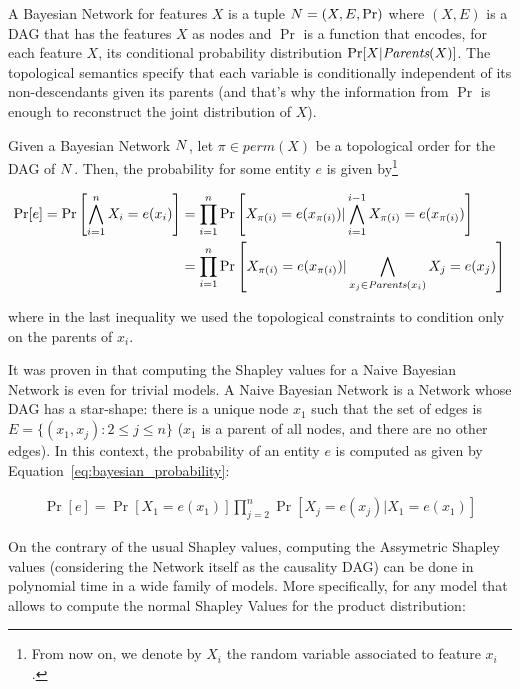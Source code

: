 A Bayesian Network for features $X$ is a tuple $N = (X, E, \Pr)$ where $(X, E)$ is a DAG that has the features $X$ as nodes and $\Pr$ is a function that encodes, for each feature $X$, its conditional probability distribution $\Pr[X | \textit{Parents}(X)]$. The topological semantics specify that each variable is conditionally independent of its non-descendants given its parents (and that's why the information from $\Pr$ is enough to reconstruct the joint distribution of $X$).

Given a Bayesian Network $N$, let $\pi \in perm(X)$ be a topological order for the DAG of $N$. Then, the probability for some entity $e$ is given by\footnote{From now on, we denote by $X_i$ the random variable associated to feature $x_i$.}

\begin{align}\label{eq:bayesian_probability}
    \Pr[e] = \Pr\left[\bigwedge_{i=1}^n X_i = e(x_i)\right] &= \prod_{i=1}^n \Pr\left[X_{\pi(i)} = e(x_{\pi(i)}) | \bigwedge_{i=1}^{i-1} X_{\pi(i)} = e(x_{\pi(i)})\right]\nonumber \\
    &= \prod_{i=1}^n \Pr\left[X_{\pi(i)} = e(x_{\pi(i)}) | \bigwedge_{x_j \in \textit{Parents}(x_i)} X_j = e(x_j)\right]
\end{align}

where in the last inequality we used the topological constraints to condition only on the parents of $x_i$.

It was proven in \cite{van2022tractability} that computing the Shapley values for a Naive Bayesian Network is \sharpPhard{} even for trivial models. A Naive Bayesian Network is a Network whose DAG has a star-shape: there is a unique node $x_1$ such that the set of edges is $E = \{(x_1, x_j) : 2 \leq j \leq n\}$ ($x_1$ is a parent of all nodes, and there are no other edges). In this context, the probability of an entity $e$ is computed as given by Equation~\ref{eq:bayesian_probability}:

\begin{align*}
    \Pr[e] = \Pr[X_1 = e(x_1)] \prod_{j=2}^n \Pr[X_j = e(x_j) | X_1 = e(x_1)]
\end{align*}

On the contrary of the usual Shapley values, computing the Assymetric Shapley values (considering the Network itself as the causality DAG) can be done in polynomial time in a wide family of models. More specifically, for any model that allows to compute the normal Shapley Values for the product distribution:

